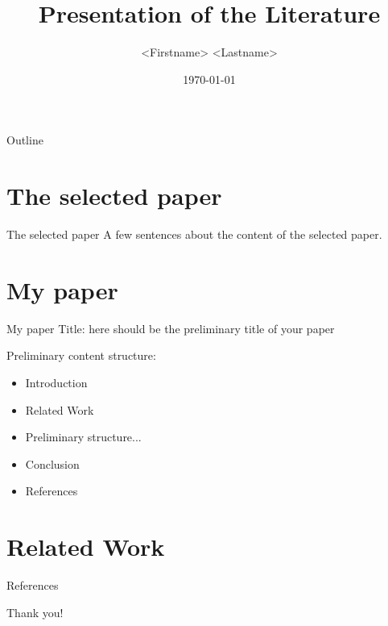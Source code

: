 \documentclass[]{beamer} %
\title{Presentation of the Literature}
\author{<Firstname> <Lastname>}
\date{\today}
\begin{document}
\maketitle

\begin{frame}[t]{Outline}
	\begin{minipage}[t][10em][t]{\linewidth}
		\tableofcontents
	\end{minipage}
\end{frame}

\section{The selected paper}

\begin{frame}{The selected paper}
	A few sentences about the content of the selected paper.
\end{frame}

\section{My paper}

\begin{frame}{My paper}
	Title: here should be the preliminary title of your paper
	
	Preliminary content structure:
	\begin{itemize}
		\item Introduction
		\item Related Work
		\item Preliminary structure...
		\item Conclusion
		\item [] References
	\end{itemize}
\end{frame}

\section{Related Work}

\begin{frame}[allowframebreaks]{References}
	\nocite{grechenig:2009:softwaretechnik}
	\printbibliography
\end{frame}

\begin{titleframe}
	\begin{center}
	\alert{\Large Thank you!}
	\end{center}
\end{titleframe}
\end{document}
